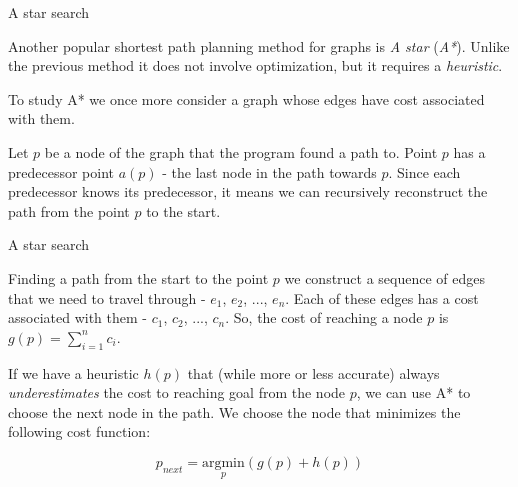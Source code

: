 \documentclass{beamer}
\begin{document}
\begin{frame}{A star search}
	\begin{flushleft}
		
		Another popular shortest path planning method for graphs is \emph{A star} (\emph{A*}). Unlike the previous method it does not involve optimization, but it requires a \emph{heuristic}.
		
		\bigskip
		
		To study A* we once more consider a graph whose edges have cost associated with them.
		
		\bigskip
		
		Let $p$ be a node of the graph that the program found a path to. Point $p$ has a predecessor point $a(p)$ - the last node in the path towards $p$. Since each predecessor knows its predecessor, it means we can recursively reconstruct the path from the point $p$ to the start.
		
	\end{flushleft}
\end{frame}


\begin{frame}{A star search}
	\begin{flushleft}
		
		Finding a path from the start to the point $p$ we construct a sequence of edges that we need to travel through - $e_1$, $e_2$, ...,  $e_n$. Each of these edges has a cost associated with them -  $c_1$, $c_2$, ...,  $c_n$. So, the cost of reaching a node $p$ is $g(p) = \sum_{i=1}^{n} c_i$.
		
		\bigskip
		
		If we have a heuristic $h(p)$ that (while more or less accurate) always \emph{underestimates} the cost to reaching goal from the node $p$, we can use A* to choose the next node in the path. We choose the node that minimizes the following cost function:
		
		\begin{equation}
			p_{next} = \underset{p}{\text{argmin}} (g(p)+h(p))
		\end{equation} 
			
	\end{flushleft}
\end{frame}
\end{document}
